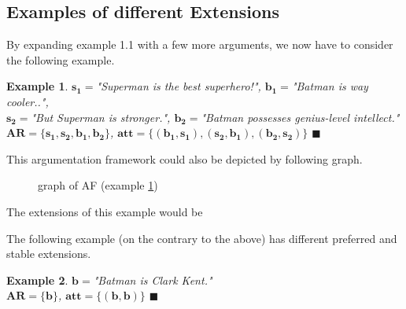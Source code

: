\documentclass[12pt]{report}
\numberwithin{figure}{chapter}
\theoremstyle{break}
\newtheorem{exmpl}{Example}[chapter]
\newenvironment{myexmpl}{\begin{exmpl}}{$\blacksquare$ \end{exmpl}}
\begin{document}
\newpage

\subsection{Examples of different Extensions}
By expanding example 1.1 with a few more arguments, we now have to consider the following example.

\begin{myexmpl}
$\bm{s_{1}=}$"Superman is the best superhero!", $\bm{b_{1}=}$"Batman is way cooler..",\\
$\bm{s_{2}=}$"But Superman is stronger.", $\bm{b_{2}=}$"Batman possesses genius-level intellect."\\
$\bm{AR = \{s_{1},s_{2},b_{1},b_{2}\}}$, $\bm{att = \{(b_{1},s_{1}),(s_{2},b_{1}),(b_{2},s_{2})\}}$
\label{s1 s2 b1 b2 ex}
\end{myexmpl}

This argumentation framework could also be depicted by following graph.\\

\begin{figure}[h!]
\begin{center}\end{center}
\caption{graph of AF (example \ref{s1 s2 b1 b2 ex})}
\end{figure}

The extensions of this example would be 

\bigskip
The following example (on the contrary to the above) has different preferred and stable extensions.

\begin{myexmpl}
$\bm{b=}$"Batman is Clark Kent."\\
$\bm{AR=\{b\}}$, $\bm{att=\{(b,b)\}}$
\label{b loop ex}
\end{myexmpl}
\end{document}
